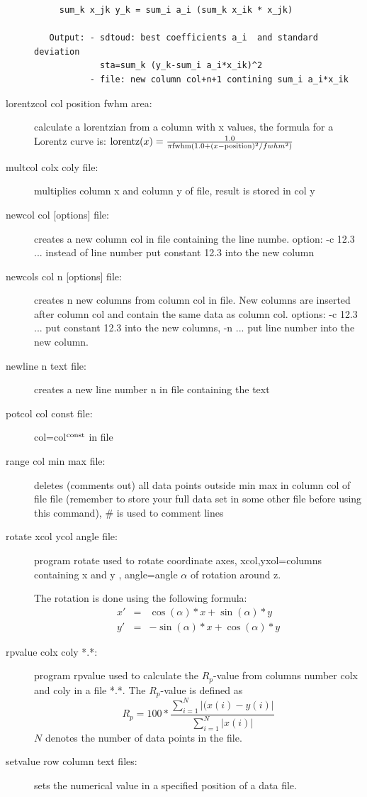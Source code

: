 \begin{description}
\begin{verbatim}
     sum_k x_jk y_k = sum_i a_i (sum_k x_ik * x_jk)

   Output: - sdtoud: best coefficients a_i  and standard deviation
             sta=sum_k (y_k-sum_i a_i*x_ik)^2
           - file: new column col+n+1 contining sum_i a_i*x_ik
\end{verbatim}

\item [\prg lorentzcol\index{lorentzcol} col position fwhm area:] calculate a lorentzian from
a column with x values, the formula for a Lorentz curve is: 
${\rm lorentz}(x)=\frac{1.0}{\pi{\rm fwhm}(1.0+(x-{\rm position})^2/fwhm^2)}$
\item [\prg multcol\index{multcol}  colx coly file:] multiplies column x and column y of file, %
result is stored in col y
\item [\prg newcol\index{newcol} col {[options]} file:] creates a new column col in file containing the line numbe. option: -c 12.3  ... instead of line number put constant 12.3 into the new column
\item [\prg newcols\index{newcols} col n {[options]} file:] creates n new columns from column col
 in file. New columns are inserted after column col and contain the same data as column col.
 options: -c 12.3 ...  put constant 12.3 into the new columns, -n ... put line number into the new column.
\item [\prg newline\index{newline} n text file:] creates a new line number n  in file containing %
the text 
\item [\prg potcol\index{potcol} col const file:]  col=col$^{\rm const}$ in file
\item [\prg range\index{range} col min max file:] deletes (comments out) all data points outside %
min max in column  col of
                       file file (remember to store your full data set in some other
		       file before using this command), \# is used to comment lines
\item[\prg rotate\index{rotate} xcol ycol angle file:]
program rotate  used to rotate coordinate axes,
 xcol,yxol=columns containing x and y , 
 angle=angle $\alpha$ of rotation around z.
 
 The rotation is done using the following formula:
\begin{eqnarray}
 x'&= &\cos(\alpha)*x+\sin(\alpha)*y \nonumber \\
 y'&=&-\sin(\alpha)*x+\cos(\alpha)*y
\end{eqnarray}
\item [\prg rpvalue\index{rpvalue} colx coly  *.*:]  program rpvalue  used to %
calculate 
                       the $R_p$-value from columns number colx and coly 
		       in a file *.*. The $R_p$-value is defined as
		       \begin{equation}
		       R_p= 100*\frac{\sum_{i=1}^{N} |(x(i)-y(i)|}{\sum_{i=1}^{N}|x(i)|}
		       \end{equation}
                       $N$ denotes the number of data points in the file.
\item [\prg setvalue\index{setvalue} row column text files:] sets the numerical value in a specified position of a data file.


\end{description}
